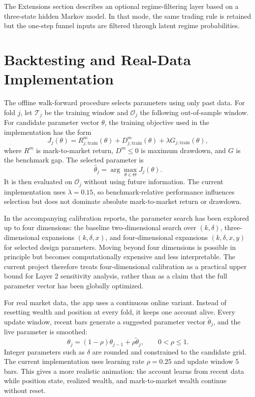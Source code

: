\documentclass[11pt]{article}
\begin{document}
The Extensions section describes an optional regime-filtering layer based on a three-state hidden Markov model. In that mode, the same trading rule is retained but the one-step funnel inputs are filtered through latent regime probabilities.

\section{Backtesting and Real-Data Implementation}

The offline walk-forward procedure selects parameters using only past data. For fold \(j\), let \(\mathcal T_j\) be the training window and \(\mathcal O_j\) the following out-of-sample window. For candidate parameter vector \(\theta\), the training objective used in the implementation has the form
\[
J_j(\theta)
=
R_{j,\mathrm{train}}^m(\theta)
+D_{j,\mathrm{train}}^m(\theta)
+\lambda G_{j,\mathrm{train}}(\theta),
\]
where \(R^m\) is mark-to-market return, \(D^m\leq 0\) is maximum drawdown, and \(G\) is the benchmark gap. The selected parameter is
\[
\hat\theta_j=\arg\max_{\theta\in\Theta}J_j(\theta).
\]
It is then evaluated on \(\mathcal O_j\) without using future information. The current implementation uses \(\lambda=0.15\), so benchmark-relative performance influences selection but does not dominate absolute mark-to-market return or drawdown.

In the accompanying calibration reports, the parameter search has been explored
up to four dimensions: the baseline two-dimensional search over \((k,\delta)\),
three-dimensional expansions \((k,\delta,x)\), and four-dimensional expansions
\((k,\delta,x,y)\) for selected design parameters. Moving beyond four
dimensions is possible in principle but becomes computationally expensive and
less interpretable. The current project therefore treats four-dimensional
calibration as a practical upper bound for Layer 2 sensitivity analysis, rather
than as a claim that the full parameter vector has been globally optimized.

For real market data, the app uses a continuous online variant. Instead of resetting wealth and position at every fold, it keeps one account alive. Every update window, recent bars generate a suggested parameter vector \(\tilde\theta_j\), and the live parameter is smoothed:
\[
\theta_j=(1-\rho)\theta_{j-1}+\rho\tilde\theta_j,
\qquad
0<\rho\leq 1.
\]
Integer parameters such as \(\delta\) are rounded and constrained to the candidate grid. The current implementation uses learning rate \(\rho=0.25\) and update window \(5\) bars. This gives a more realistic animation: the account learns from recent data while position state, realized wealth, and mark-to-market wealth continue without reset.
\end{document}
